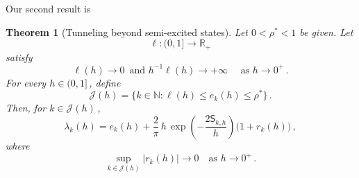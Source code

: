 \documentclass[11pt]{amsart}
\numberwithin{equation}{section}
\newtheorem{theorem}{Theorem}[section]
\theoremstyle{remark}
\begin{document}
Our second result is
%

\begin{theorem}[Tunneling beyond semi-excited states]\label{thm:main}
	Let \(0<\rho^\ast<1\) be given. Let
	\[
	\ell:(0,1]\longrightarrow \mathbb R_+
	\]
	satisfy
	\[
	\ell(h)\longrightarrow 0\,\mbox{ and }
		h^{-1}\ell(h)\longrightarrow +\infty
	\quad\text{ as }h\longrightarrow0^+\,.
	\]
	For every \(h\in(0,1]\)\,, define
	\begin{equation}\label{eq:cond-mu}
	\mathcal J(h)
	=
	\bigl\{
	k\in\mathbb N:
	\ell(h)\leq e_k(h)\leq \rho^\ast
	\bigr\}\,.
	\end{equation}
	Then, for \(k\in\mathcal J(h)\)\,,
	\begin{equation}\label{eq:main-asy}
	\lambda_k(h)
	=
	e_k(h)
	+
	\frac{2}{\pi}\,h\,
	\exp\!\left(
	-\frac{2\mathsf S_{k,h}}{h}
	\right)
	\bigl(1+r_k(h)\bigr)\,,
	\end{equation}
	where
	\[\sup_{k\in\mathcal J(h)}|r_k(h)|\longrightarrow0\quad \text{as $h\longrightarrow0^+\,.$}\]
\end{theorem}
%
%
\end{document}

